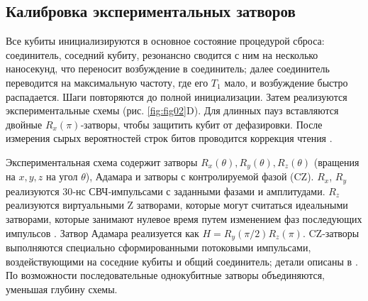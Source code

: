\begin{table}[h]

    \label{tab:tab10}
\end{table}


\subsection*{Калибровка экспериментальных затворов}

Все кубиты инициализируются в основное состояние процедурой сброса:
соединитель, соседний кубиту, резонансно сводится с ним на несколько
наносекунд, что переносит возбуждение в соединитель; далее соединитель
переводится на максимальную частоту, где его $T_{1}$ мало, и возбуждение быстро
распадается. Шаги повторяются до полной инициализации. Затем реализуются
экспериментальные схемы (рис. \ref{fig:fig02}D). Для длинных пауз вставляются
двойные $R_{x}(\pi)$‑затворы, чтобы защитить кубит от дефазировки. После
измерения сырых вероятностей строк битов проводится коррекция чтения
\cite{cite_45}.

Экспериментальная схема содержит затворы $R_{x}(\theta),R_{y}(\theta),R_{z}
(\theta)$ (вращения на $x,y,z$ на угол $\theta$), Адамара и затворы
с контролируемой фазой (CZ). $R_{x}$, $R_{y}$ реализуются 30‑нс СВЧ‑импульсами
с заданными фазами и амплитудами. $R_{z}$ реализуются виртуальными Z затворами,
которые могут считаться идеальными затворами, которые занимают нулевое
время путем изменением фаз последующих импульсов \cite{cite_46}. Затвор Адамара
реализуется как $H = R_{y}(\pi/2)R_{z}(\pi)$. CZ‑затворы выполняются специально
сформированными потоковыми импульсами, воздействующими на соседние кубиты
и общий соединитель; детали описаны в \cite{cite_34,cite_47}. По возможности
последовательные однокубитные затворы объединяются, уменьшая глубину схемы.

